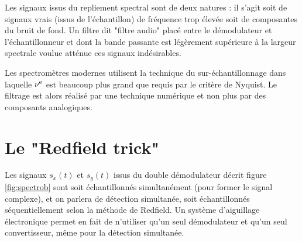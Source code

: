 Les signaux issus du repliement spectral 
sont de deux natures : il s'agit soit de signaux vrais 
(issus de l'échantillon) de fréquence trop
élevée soit de composantes du bruit de fond.
Un filtre dit "filtre audio" placé entre le démodulateur et l'échantillonneur
et dont la bande passante est légèrement supérieure à la largeur spectrale
voulue atténue ces signaux indésirables.

Les spectromètres modernes utilisent la technique du sur-échantillonnage dans
laquelle $\nu^{\mbox{\footnotesize{e}}}$ est beaucoup plus grand que requis par le critère de Nyquist.
Le filtrage est alors réalisé par une technique numérique et non plus
par des composants analogiques.

\section{Le "Redfield trick"}
\label{sec:redfield}

Les signaux $s_x(t)$ et $s_y(t)$ issus du double démodulateur décrit figure
\ref{fig:spectrob} sont soit
échantillonnés simultanément (pour former le signal complexe), 
et on parlera de détection simultanée, soit échantillonnés
séquentiellement selon la méthode de Redfield.
Un système d'aiguillage électronique permet en fait de n'utiliser 
qu'un seul démodulateur et qu'un seul convertisseur, même pour
la détection simultanée.

